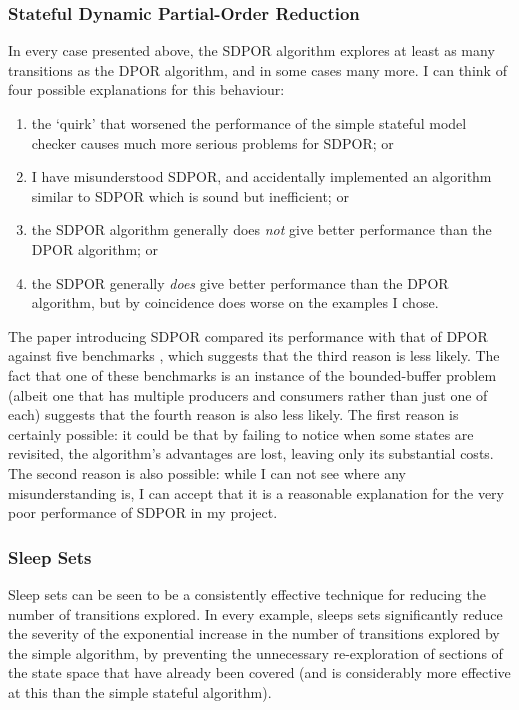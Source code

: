 \documentclass[12pt,a4paper,twoside,openright]{report}
\begin{document}
\subsubsection{Stateful Dynamic Partial-Order Reduction}
In every case presented above, the SDPOR algorithm
explores at least as many transitions as the DPOR
algorithm, and in some cases many more. I can think
of four possible explanations for this behaviour:
\begin{enumerate}
	\item the `quirk' that worsened the performance
	of the simple stateful model checker causes
	much more serious problems for SDPOR; or
	\item I have misunderstood SDPOR, and
	accidentally implemented an algorithm similar
	to SDPOR which is sound but inefficient; or
	\item the SDPOR algorithm generally does \emph{not}
	give better performance than the DPOR algorithm; or
	\item the SDPOR generally \emph{does} give better
	performance than the DPOR algorithm, but by
	coincidence does worse on the examples I chose.
\end{enumerate}
The paper introducing SDPOR compared its performance
with that of DPOR against five benchmarks \cite{yang08},
which suggests that the third reason is less likely.
The fact that one of these benchmarks is an instance
of the bounded-buffer problem (albeit one that
has multiple producers and consumers rather than
just one of each) suggests that the fourth reason
is also less likely. The first reason is certainly
possible: it could be that by failing to notice
when some states are revisited, the algorithm's
advantages are lost, leaving only its substantial
costs.
The second reason is also possible:
while I can not see where any
misunderstanding is, I can accept that it is
a reasonable explanation for the very poor
performance of SDPOR in my project.

\subsubsection{Sleep Sets}
Sleep sets can be seen to be a consistently
effective technique for reducing the number
of transitions explored. In every example,
sleeps sets significantly reduce the
severity of the exponential increase in
the number of transitions explored by the
simple algorithm, by preventing the
unnecessary re-exploration of sections
of the state space that have already been
covered (and is considerably more effective
at this than the simple stateful algorithm).
\end{document}
